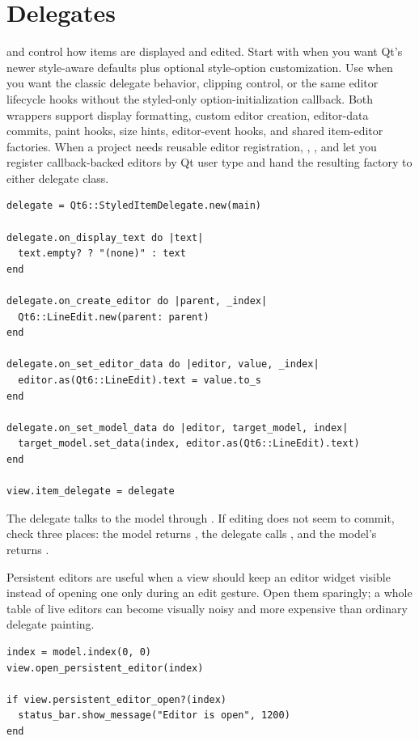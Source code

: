 \clearpage

\section{Delegates}

 and  control how items are displayed and edited. Start with  when you want Qt's newer style-aware defaults plus optional style-option customization. Use  when you want the classic delegate behavior, clipping control, or the same editor lifecycle hooks without the styled-only option-initialization callback. Both wrappers support display formatting, custom editor creation, editor-data commits, paint hooks, size hints, editor-event hooks, and shared item-editor factories. When a project needs reusable editor registration, , , and  let you register callback-backed editors by Qt user type and hand the resulting factory to either delegate class.

\begin{lstlisting}[style=crystal]
delegate = Qt6::StyledItemDelegate.new(main)

delegate.on_display_text do |text|
  text.empty? ? "(none)" : text
end

delegate.on_create_editor do |parent, _index|
  Qt6::LineEdit.new(parent: parent)
end

delegate.on_set_editor_data do |editor, value, _index|
  editor.as(Qt6::LineEdit).text = value.to_s
end

delegate.on_set_model_data do |editor, target_model, index|
  target_model.set_data(index, editor.as(Qt6::LineEdit).text)
end

view.item_delegate = delegate
\end{lstlisting}

The delegate talks to the model through . If editing does not seem to commit, check three places: the model returns , the delegate calls , and the model's  returns .

Persistent editors are useful when a view should keep an editor widget visible instead of opening one only during an edit gesture. Open them sparingly; a whole table of live editors can become visually noisy and more expensive than ordinary delegate painting.

\begin{lstlisting}[style=crystal]
index = model.index(0, 0)
view.open_persistent_editor(index)

if view.persistent_editor_open?(index)
  status_bar.show_message("Editor is open", 1200)
end
\end{lstlisting}

